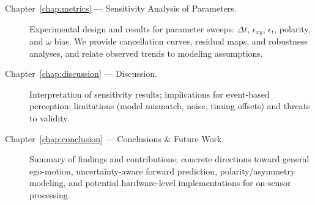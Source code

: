 \begin{description}
    \item[Chapter~\ref{chap:metrics} --- Sensitivity Analysis of Parameters.] Experimental design and results for parameter sweeps: $\Delta t$, $\epsilon_{xy}$, $\epsilon_t$, polarity, and $\omega$ bias. We provide cancellation curves, residual maps, and robustness analyses, and relate observed trends to modeling assumptions.
    \item[Chapter~\ref{chap:discussion} --- Discussion.] Interpretation of sensitivity results; implications for event-based perception; limitations (model mismatch, noise, timing offsets) and threats to validity.
    \item[Chapter~\ref{chap:conclusion} --- Conclusions \& Future Work.] Summary of findings and contributions; concrete directions toward general ego-motion, uncertainty-aware forward prediction, polarity/asymmetry modeling, and potential hardware-level implementations for on-sensor processing.
\end{description}
